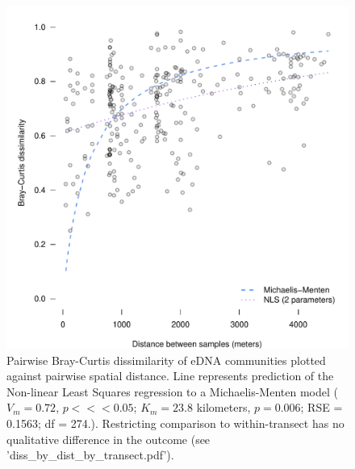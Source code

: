 \documentclass[11pt,letterpaper]{article} %
\begin{document}
{\begin{figure}[h!] %
  \centering
    \includegraphics[width=1\textwidth]{../../Figures/diss_by_dist.pdf}
    \caption{Pairwise Bray-Curtis dissimilarity of eDNA communities plotted against pairwise spatial distance.
    Line represents prediction of the Non-linear Least Squares regression to a Michaelis-Menten model ($V_m = 0.72$, $p <<< 0.05$; $K_m = 23.8$ kilometers, $p = 0.006$; RSE = 0.1563; df = 274.).
    Restricting comparison to within-transect has no qualitative difference in the outcome (see 'diss\_by\_dist\_by\_transect.pdf').
    }
  \label{comm_diss_by_geo_dist} %
\end{figure}

}
\end{document}
